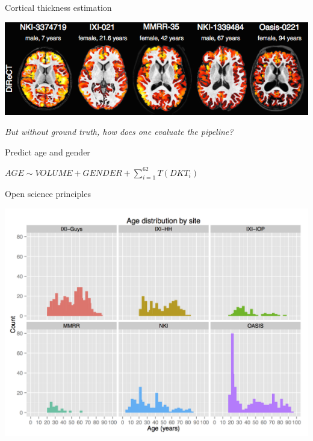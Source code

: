 \documentclass[ignorenonframetext,]{beamer}
\begin{document}
\begin{frame}{Cortical thickness estimation}

\includegraphics{./evaluation/figures/corticalThicknessEstimation.png}

\end{frame}

\begin{frame}{\emph{But without ground truth, how does one evaluate the
pipeline?}}

\end{frame}

\begin{frame}{Predict age and gender}

$AGE \sim VOLUME + GENDER + \sum_{i=1}^{62} T(DKT_i)$

\end{frame}

\begin{frame}{Open science principles}

\includegraphics{./evaluation/figures/ageDistribution.png}

\end{frame}
\end{document}
